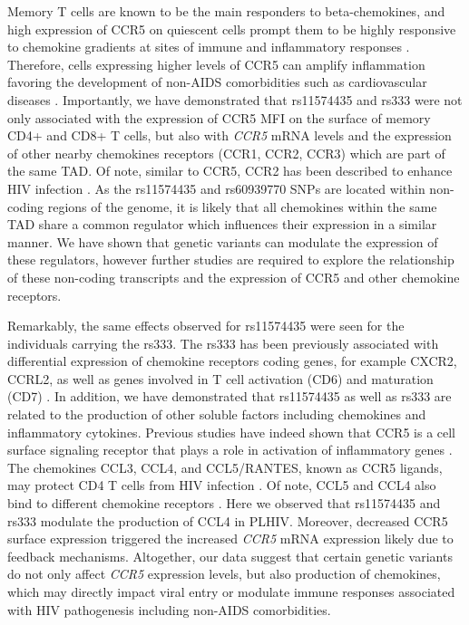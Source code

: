\documentclass{book}
\begin{document}
\begin{refsection}
Memory T cells are known to be the main responders to beta-chemokines, and high expression of CCR5 on quiescent cells prompt them to be highly responsive to chemokine gradients at sites of immune and inflammatory responses \cite{Fukada2002Functional,Kohlmeier2008The}.
Therefore, cells expressing higher levels of CCR5 can amplify inflammation favoring the development of non-AIDS comorbidities such as cardiovascular diseases \cite{Cochain2016Protective}.
Importantly, we have demonstrated that rs11574435 and rs333 were not only associated with the expression of CCR5 MFI on the surface of memory CD4+ and CD8+ T cells, but also with \textit{CCR5} mRNA levels and the expression of other nearby chemokines receptors (CCR1, CCR2, CCR3) which are part of the same TAD.
Of note, similar to CCR5, CCR2 has been described to enhance HIV infection \cite{Ansari2007Dichotomous}.
As the rs11574435 and rs60939770 SNPs are located within non-coding regions of the genome, it is likely that all chemokines within the same TAD share a common regulator which influences their expression in a similar manner.
We have shown that genetic variants can modulate the expression of these regulators, however further studies are required to explore the relationship of these non-coding transcripts and the expression of CCR5 and other chemokine receptors.  

Remarkably, the same effects observed for rs11574435 were seen for the individuals carrying the rs333.
The rs333 has been previously associated with differential expression of chemokine receptors coding genes, for example CXCR2, CCRL2, as well as genes involved in T cell activation (CD6) and maturation (CD7) \cite{Hütter2011The}.
In addition, we have demonstrated that rs11574435 as well as rs333 are related to the production of other soluble factors including chemokines and inflammatory cytokines.
Previous studies have indeed shown that CCR5 is a cell surface signaling receptor that plays a role in activation of inflammatory genes \cite{Shaheen2019CCR5}.
The chemokines CCL3, CCL4, and CCL5/RANTES, known as CCR5 ligands, may protect CD4 T cells from HIV infection \cite{Abdelwahab2003HIV}.
Of note, CCL5 and CCL4 also bind to different chemokine receptors \cite{Blanpain1999CCR5}.
Here we observed that rs11574435 and rs333 modulate the production of CCL4 in PLHIV.
Moreover, decreased CCR5 surface expression triggered the increased \textit{CCR5} mRNA expression likely due to feedback mechanisms.
Altogether, our data suggest that certain genetic variants do not only affect \textit{CCR5} expression levels, but also production of chemokines, which may directly impact viral entry or modulate immune responses associated with HIV pathogenesis including non-AIDS comorbidities.


\end{refsection}
\end{document}
